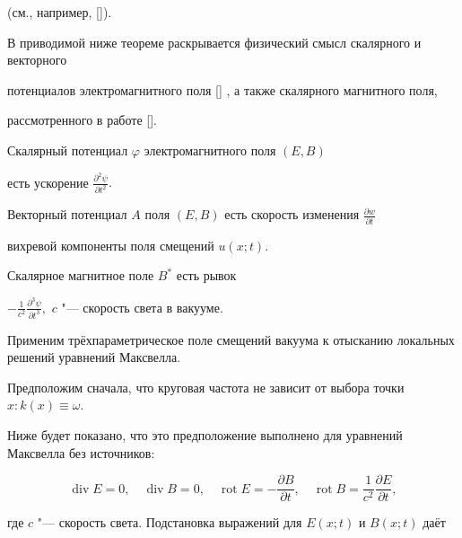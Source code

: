 (см., например, []).



В приводимой ниже теореме раскрывается физический смысл скалярного и векторного 

потенциалов электромагнитного поля [] , а также скалярного магнитного поля, 

рассмотренного в работе []. 



\smallskip



\begin{theorem}[3]Скалярный потенциал $\varphi$ электромагнитного поля $(E, B)$  

есть ускорение $\frac{\partial^2\psi}{\partial t^2}.$

 

Векторный потенциал $A$ поля $(E,B)$ есть скорость изменения $\frac{\partial w}{\partial t}$

вихревой компоненты поля смещений $u(x;t).$



Скалярное магнитное поле $B^*$ есть рывок 

$-\frac{1}{c^2}\frac{\partial^3\psi}{\partial t^3},$ $c$ "--- скорость света в вакууме$.$

\end{theorem}



\smallskip



Применим трёхпараметрическое поле смещений вакуума к отысканию локальных решений уравнений Максвелла. 

Предположим сначала, что круговая частота не зависит от выбора точки $x : k(x) \equiv \omega$. 

Ниже будет показано, что это предположение выполнено для уравнений Максвелла без источников: 

$$

\mathop{\mathrm{div}} E = 0, \quad  

\mathop{\mathrm{div}} B = 0, \quad 

\mathop{\mathrm{rot}} E = - \frac{\partial B}{\partial t}, \quad 

\mathop{\mathrm{rot}} B = \frac{1}{c^2} \frac{\partial E}{\partial t},

$$

где $c$ "--- скорость света. Подстановка выражений для $E(x;t)$ и $B(x;t)$ даёт 

